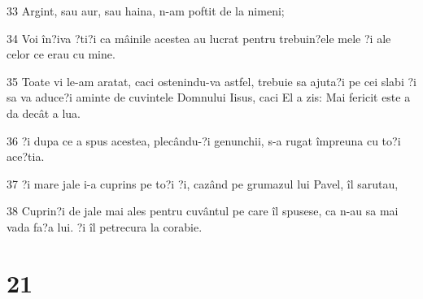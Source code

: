\par 33 Argint, sau aur, sau haina, n-am poftit de la nimeni;
\par 34 Voi în?iva ?ti?i ca mâinile acestea au lucrat pentru trebuin?ele mele ?i ale celor ce erau cu mine.
\par 35 Toate vi le-am aratat, caci ostenindu-va astfel, trebuie sa ajuta?i pe cei slabi ?i sa va aduce?i aminte de cuvintele Domnului Iisus, caci El a zis: Mai fericit este a da decât a lua.
\par 36 ?i dupa ce a spus acestea, plecându-?i genunchii, s-a rugat împreuna cu to?i ace?tia.
\par 37 ?i mare jale i-a cuprins pe to?i ?i, cazând pe grumazul lui Pavel, îl sarutau,
\par 38 Cuprin?i de jale mai ales pentru cuvântul pe care îl spusese, ca n-au sa mai vada fa?a lui. ?i îl petrecura la corabie.

\chapter{21}

